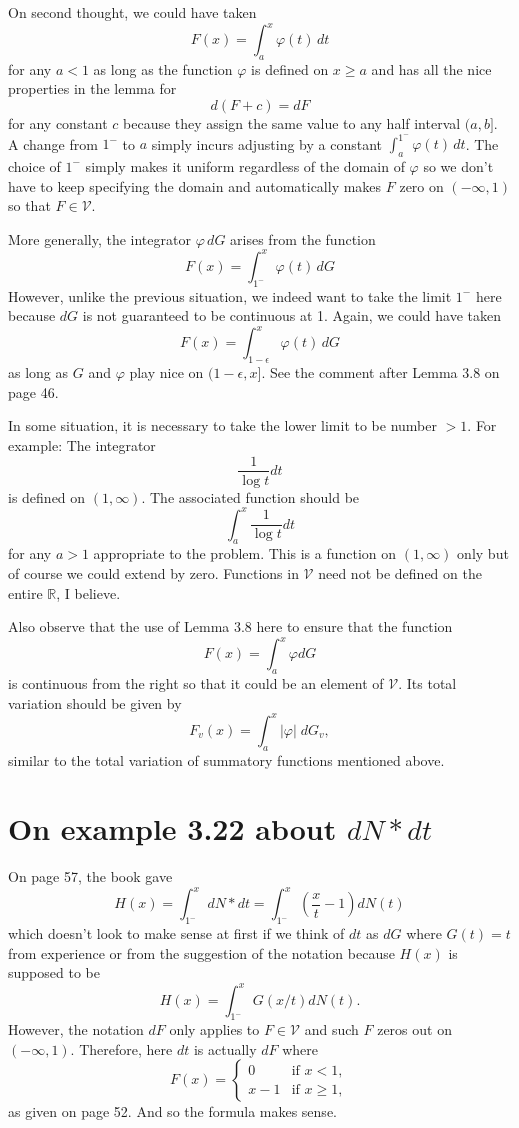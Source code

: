 \documentclass{article}
\newcommand{\Abs}[1]{\left| #1 \right|}
\newcommand{\R}{\mathbb{R}}
\newcommand{\V}{\mathcal{V}}
\begin{document}
On second thought, we could have taken
$$F(x) = \int_a^x \varphi(t) \, dt$$
for any $a < 1$ as long as the function $\varphi$ is defined on $x \geq a$ and has all the nice properties in the lemma for
$$d(F + c) = dF$$
for any constant $c$ because they assign the same value to any half interval $(a, b]$. A change from $1^-$ to $a$ simply incurs adjusting by a constant $\int_a^{1^-} \varphi(t) \, dt$. The choice of $1^-$ simply makes it uniform regardless of the domain of $\varphi$ so we don't have to keep specifying the domain and automatically makes $F$ zero on $(-\infty, 1)$ so that $F \in \V$.

More generally, the integrator $\varphi \, dG$ arises from the function
$$F(x) = \int_{1^-}^x \varphi(t) \, dG$$
However, unlike the previous situation, we indeed want to take the limit $1^-$ here because $dG$ is not guaranteed to be continuous at 1. Again, we could have taken
$$F(x) = \int_{1 - \epsilon}^x \varphi(t) \, dG$$
as long as $G$ and $\varphi$ play nice on $(1 - \epsilon, x]$. See the comment after Lemma 3.8 on page 46.

In some situation, it is necessary to take the lower limit to be number $> 1$. For example: The integrator
$$\frac{1}{\log t} dt$$
is defined on $(1, \infty)$. The associated function should be
$$\int_a^x \frac{1}{\log t} dt$$
for any $a > 1$ appropriate to the problem. This is a function on $(1, \infty)$ only but of course we could extend by zero. Functions in $\V$ need not be defined on the entire $\R$, I believe.

Also observe that the use of Lemma 3.8 here to ensure that the function
$$F(x) = \int_a^x \varphi dG$$
is continuous from the right so that it could be an element of $\V$. Its total variation should be given by
$$F_v(x) = \int_a^x \Abs{ \varphi } \; dG_v,$$
similar to the total variation of summatory functions mentioned above.

\section{On example 3.22 about $dN * dt$}

On page 57, the book gave
$$H(x) = \int_{1^-}^x dN * dt = \int_{1^-}^x (\frac xt - 1) dN(t)$$
which doesn't look to make sense at first if we think of $dt$ as $dG$ where $G(t) = t$ from experience or from the suggestion of the notation because $H(x)$ is supposed to be
$$H(x) = \int_{1^-}^x G(x/t) dN(t).$$
However, the notation $dF$ only applies to $F \in \V$ and such $F$ zeros out on $(-\infty, 1)$. Therefore, here $dt$ is actually $dF$ where
$$F(x) = \begin{cases}
0 &\text{if } x < 1,\\
x - 1 &\text{if } x \geq 1,
\end{cases}$$
as given on page 52. And so the formula makes sense.
\end{document}
